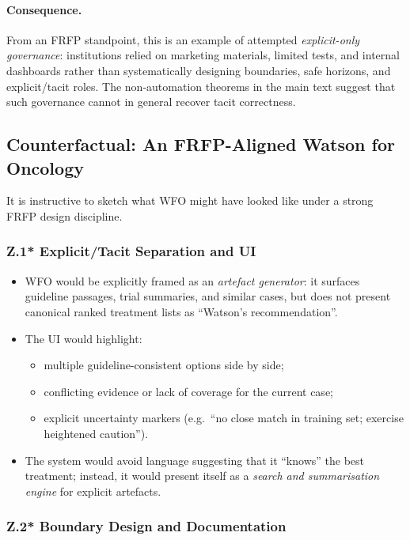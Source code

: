 \paragraph{Consequence.}
From an FRFP standpoint, this is an example of attempted \emph{explicit-only
governance}:
institutions relied on marketing materials, limited tests, and internal
dashboards rather than systematically designing boundaries, safe horizons,
and explicit/tacit roles.
The non-automation theorems in the main text suggest that such governance
cannot in general recover tacit correctness.

\subsection{Counterfactual: An FRFP-Aligned Watson for Oncology}

It is instructive to sketch what WFO might have looked like under a strong
FRFP design discipline.

\subsubsection*{Z.1* Explicit/Tacit Separation and UI}

\begin{itemize}
  \item WFO would be explicitly framed as an \emph{artefact generator}:
        it surfaces guideline passages, trial summaries, and similar cases,
        but does not present canonical ranked treatment lists as ``Watson’s
        recommendation''.
  \item The UI would highlight:
        \begin{itemize}
          \item multiple guideline-consistent options side by side;
          \item conflicting evidence or lack of coverage for the current case;
          \item explicit uncertainty markers (e.g.\ ``no close match in
                training set; exercise heightened caution'').
        \end{itemize}
  \item The system would avoid language suggesting that it ``knows'' the best
        treatment; instead, it would present itself as a \emph{search and
        summarisation engine} for explicit artefacts.
\end{itemize}

\subsubsection*{Z.2* Boundary Design and Documentation}

